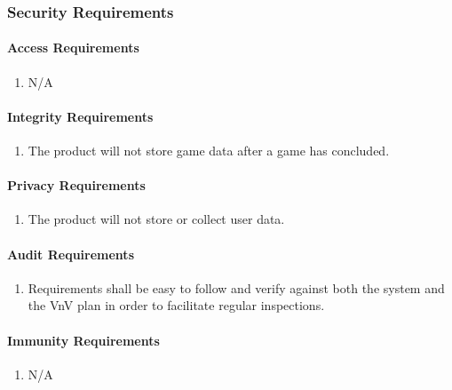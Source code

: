 \documentclass[12pt]{article}
\begin{document}
\subsubsection{Security Requirements}
\label{NFR_SR}
\paragraph{Access Requirements}
\begin{enumerate}[{SR}1., leftmargin=2\parindent]
    \item N/A
\end{enumerate}

\paragraph{Integrity Requirements}
\begin{enumerate}[{SR}1., leftmargin=2\parindent, resume]
    \item The product will not store game data after a game has concluded.
\end{enumerate}

\paragraph{Privacy Requirements}
\begin{enumerate}[{SR}1., leftmargin=2\parindent, resume]
    \item The product will not store or collect user data.
\end{enumerate}

\paragraph{Audit Requirements}
\begin{enumerate}[{SR}1., leftmargin=2\parindent, resume]
    \item Requirements shall be easy to follow and verify against both the system and the VnV plan in order to facilitate regular inspections.
\end{enumerate}

\paragraph{Immunity Requirements}
\begin{enumerate}[{SR}1., leftmargin=2\parindent, resume]
    \item N/A
\end{enumerate}
\end{document}
